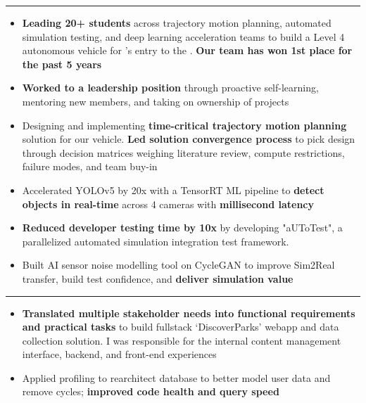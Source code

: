 \documentclass[10pt,a4paper,ragged2e,withhyper]{altacv}
\begin{document}
{\color{accent}\hrule \vspace{0.1cm}}
\begin{itemize}
  \item \textbf{Leading 20+ students} across trajectory motion planning, automated simulation testing, and deep learning acceleration teams to build a Level 4 autonomous vehicle for 's entry to the . \textbf{Our team has won 1st place for the past 5 years}
  \item \textbf{Worked to a leadership position} through proactive self-learning, mentoring new members, and taking on ownership of projects
  \item Designing and implementing \textbf{time-critical trajectory motion planning} solution for our vehicle. \textbf{Led solution convergence process} to pick design through decision matrices weighing literature review, compute restrictions, failure modes, and team buy-in
  \item Accelerated YOLOv5 by 20x with a TensorRT ML pipeline to \textbf{detect objects in real-time} across 4 cameras with \textbf{millisecond latency}
  \item \textbf{Reduced developer testing time by 10x} by developing "aUToTest", a parallelized automated simulation integration test framework.
  \item Built AI sensor noise modelling tool on CycleGAN to improve Sim2Real transfer, build test confidence, and \textbf{deliver simulation value}
\end{itemize}

{\color{accent}\hrule \vspace{0.1cm}}
\begin{itemize}
  \item \textbf{Translated multiple stakeholder needs into functional requirements and practical tasks} to build fullstack `DiscoverParks' webapp and data collection solution. I was responsible for the internal content management interface, backend, and front-end experiences
  \item Applied profiling to rearchitect database to better model user data and remove cycles; \textbf{improved code health and query speed}
\end{itemize}
\end{document}
